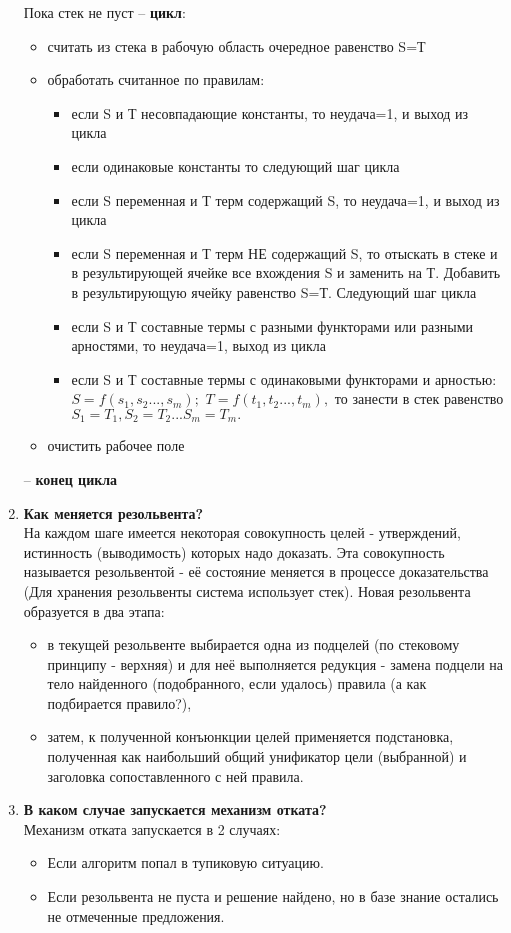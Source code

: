 \begin{enumerate}
	Пока стек не пуст – \textbf{цикл}:
	\begin{itemize}
		\item	считать из стека в рабочую область очередное равенство S=Т
		\item	обработать считанное по правилам:
		\begin{itemize}
			\item	если S и Т несовпадающие константы,			то неудача=1, и выход из цикла
			\item	если одинаковые константы					то следующий шаг цикла
			\item	если S переменная и Т терм содержащий S,		то неудача=1, и выход из цикла
			\item	если S переменная и Т терм НЕ содержащий S,	то отыскать в стеке и в результирующей ячейке все вхождения S и заменить на Т. Добавить в результирующую ячейку равенство S=Т.  Следующий шаг цикла
			\item	если S и Т составные термы с разными функторами или разными арностями, то неудача=1, выход из цикла
			\item	если S и Т составные термы с одинаковыми функторами и арностью: $S=f(s_1,s_2 ...,s_m);$   $T=f(t_1,t_2 ...,t_m),$  то занести в стек равенство $S_1=T_1, S_2=T_2 ... S_m=T_m.$
		\end{itemize}
		\item	очистить рабочее поле
	\end{itemize}
	–  \textbf{конец цикла}

    \item \textbf{Как меняется резольвента?}\\
   	На каждом шаге имеется некоторая совокупность целей - утверждений, истинность (выводимость) которых надо доказать. Эта совокупность называется резольвентой - её состояние меняется в процессе доказательства (Для хранения резольвенты система использует стек). 
   	Новая резольвента образуется в два этапа:
   	\begin{itemize}
   		\item в текущей резольвенте выбирается одна из подцелей (по стековому принципу - верхняя) и для неё выполняется редукция - замена подцели на тело найденного (подобранного, если удалось) правила (а как подбирается правило?),
   		\item затем, к полученной конъюнкции целей применяется подстановка, полученная как наибольший общий унификатор цели (выбранной) и заголовка сопоставленного с ней правила.
   	\end{itemize}	

    \item \textbf{В каком случае запускается механизм отката?}\\
    Механизм отката запускается в 2 случаях:
    \begin{itemize}
    	\item Если алгоритм попал в тупиковую ситуацию. 
    	\item Если резольвента не пуста и решение найдено, но в базе знание остались не отмеченные предложения.
    \end{itemize}  
\end{enumerate}

